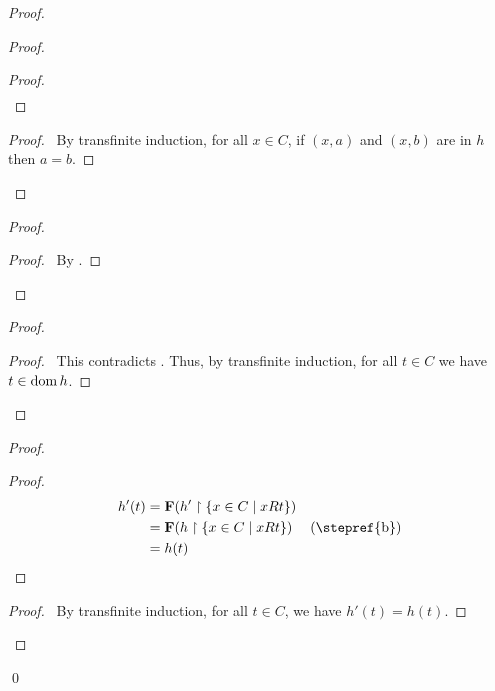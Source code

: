 \begin{proof}
\begin{proof}
\begin{proof}
\begin{align*}
            \end{align*}
        \end{proof}
        \qedstep
        \begin{proof}
            \pf\ By transfinite induction, for all $x \in C$, if $(x,a)$ and $(x,b)$ are in $h$ then $a = b$.
        \end{proof}
    \end{proof}
    \begin{proof}
        \begin{proof}
            \pf\ By .
        \end{proof}
    \end{proof}
    \begin{proof}
        \qedstep
        \begin{proof}
            \pf\ This contradicts . Thus, by transfinite induction,
            for all $t \in C$ we have $t \in \operatorname{dom} h$.
        \end{proof}
    \end{proof}
    \begin{proof}
        \begin{proof}
            \pf
            \begin{align*}
                h'(t) & = \mathbf{F}(h' \restriction \{ x \in C \mid x R t \}) \\
                & = \mathbf{F}(h \restriction \{ x \in C \mid x R t \}) & (\text{\stepref{b}}) \\
                & = h(t)
            \end{align*}
        \end{proof}
        \qedstep
        \begin{proof}
            \pf\ By transfinite induction, for all $t \in C$, we have $h'(t) = h(t)$.
        \end{proof}
    \end{proof}
    \qed
\end{proof}

